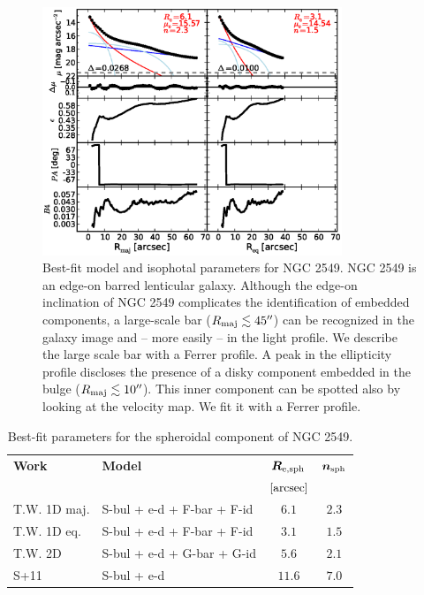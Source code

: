 \documentclass[preprint2]{emulateapj}
\newcommand{\fitfigurewidth}{0.8\textwidth}
\begin{document}
  \begin{figure}[h]
  \begin{center}
  \includegraphics[width=\fitfigurewidth]{images/n2549_1Dfit.eps}
  \caption{Best-fit model and isophotal parameters for NGC 2549.
  NGC 2549 is an edge-on barred lenticular galaxy. 
  Although the edge-on inclination of NGC 2549 complicates the identification of embedded components, 
  a large-scale bar ($R_{\rm maj} \lesssim 45''$) can be recognized in the galaxy image and -- more easily -- in the light profile.
  We describe the large scale bar with a Ferrer profile.
  A peak in the ellipticity profile discloses the presence of a disky component
  embedded in the bulge ($R_{\rm maj} \lesssim 10''$).
  This inner component can be spotted also by looking at the velocity map.
  We fit it with a Ferrer profile.
  }
  \end{center}
  \end{figure}

  \begin{table}[h]
  \small
  \caption{Best-fit parameters for the spheroidal component of NGC 2549.}
  \begin{center}
  \begin{tabular}{llcc}
  \hline
  {\bf Work} & {\bf Model}   & $\bm R_{\rm e,sph}$    & $\bm n_{\rm sph}$ \\
    &  &  $[\rm arcsec]$ & \\
  \hline
  T.W. 1D maj. & S-bul + e-d + F-bar + F-id & $6.1$  &  $2.3$ \\
  T.W. 1D eq.  & S-bul + e-d + F-bar + F-id & $3.1$  &  $1.5$ \\
  T.W. 2D      & S-bul + e-d + G-bar + G-id & $5.6$  &  $2.1$ \\
  \hline
  S+11         & S-bul + e-d & $11.6$  &  $7.0$ \\
  \hline
  \end{tabular}
  \end{center}
  \label{tab:n2549}
  \end{table}
\end{document}
